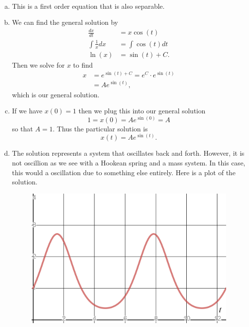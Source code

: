 \documentclass[12pt]{article} %
\begin{document}
\begin{solution}~
\begin{enumerate}[(a)]
    \item This is a first order equation that is also separable.
    \item We can find the general solution by 
    \begin{align*}
        \frac{dx}{dt}&= x\cos(t)\\
        \int \frac{1}{x}dx &= \int \cos(t)dt\\
        \ln(x)&=\sin(t)+C.
    \end{align*}
    Then we solve for $x$ to find
    \begin{align*}
        x&=e^{\sin(t)+C}=e^C \cdot e^{\sin(t)}\\
        &= Ae^{\sin(t)},
    \end{align*}
    which is our general solution.
    \item If we have $x(0)=1$ then we plug this into our general solution
    \[
    1=x(0)=Ae^{\sin(0)}=A
    \]
    so that $A=1$. Thus the particular solution is
    \[
    \boxed{x(t)=Ae^{\sin(t)}.}
    \]
    \item The solution represents a system that oscillates back and forth. However, it is not oscillion as we see with a Hookean spring and a mass system.  In this case, this would a oscillation due to something else entirely. Here is a plot of the solution.
    \begin{figure}[H]
        \centering
        \includegraphics[width=\textwidth]{esint.png}
    \end{figure}
\end{enumerate}
\end{solution}
\end{document}
